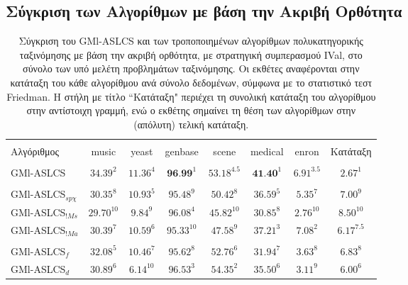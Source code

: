 \subsection{Σύγκριση των Αλγορίθμων με βάση την Ακριβή Ορθότητα}

\begin{table}[!h]
\begin{center}
    \caption[Σύγκριση του GMl-ASLCS και των τροποποιημένων αλγορίθμων πολυκατηγορικής ταξινόμησης με βάση την ακριβή ορθότητα, με μέθοδο ταξινόμησης IVal, στο σύνολο των υπό μελέτη προβλημάτων ταξινόμησης.] {Σύγκριση του GMl-ASLCS και των τροποποιημένων αλγορίθμων πολυκατηγορικής ταξινόμησης με βάση την ακριβή ορθότητα, με στρατηγική συμπερασμού IVal, στο σύνολο των υπό μελέτη προβλημάτων ταξινόμησης. Οι εκθέτες αναφέρονται στην κατάταξη του κάθε αλγορίθμου ανά σύνολο δεδομένων, σύμφωνα με το στατιστικό τεστ Friedman. Η στήλη με τίτλο “Κατάταξη" περιέχει τη συνολική κατάταξη του αλγορίθμου στην αντίστοιχη γραμμή, ενώ ο εκθέτης σημαίνει τη θέση των αλγορίθμων στην (απόλυτη) τελική κατάταξη.}
	\label{table:exactMatchBasedComparisonVars}
    \begin{tabular}{l|cccccc|c}
    \hline \\ [-2ex] 
    Αλγόριθμος           & music        & yeast       & genbase       & scene   & medical      & enron        & Κατάταξη   \\   \hline \\ [-2ex] 
    GMl-ASLCS            & $34.39^2$    & $11.36^4$   & $\textbf{96.99}^1$     & $53.18^{4.5}$ & $\textbf{41.40}^1$    & $6.91^{3.5}$ & $2.67^1$          \\ \hline \\ [-2ex]
    GMl-ASLCS$_{sp\chi}$  & $30.35^8$    & $10.93^5$   & $95.48^9$     & $50.42^8$ & $36.59^5$    & $5.35^7$     & $7.00^9$       \\
    GMl-ASLCS$_{!Ms}$    & $29.70^{10}$ & $9.84^9$    & $96.08^4$     & $45.82^{10}$ & $30.85^8$    & $2.76^{10}$  & $8.50^{10}$         \\
    GMl-ASLCS$_{!Ma}$    & $30.39^7$    & $10.59^6$   & $95.33^{10}$  & $47.58^9$ & $37.21^3$    & $7.08^2$     & $6.17^{7.5}$         \\ \hline \\ [-2ex]
    GMl-ASLCS$_{f}$      & $32.08^5$    & $10.46^7$   & $95.62^8$     & $52.76^6$ & $31.94^7$    & $3.63^8$     & $6.83^8$      \\
    GMl-ASLCS$_{d}$      & $30.89^6$    & $6.14^{10}$ & $96.53^3$     & $54.35^2$ & $35.50^6$    & $3.11^9$     & $6.00^6$         \\

\end{tabular}
\end{center}
\end{table}
